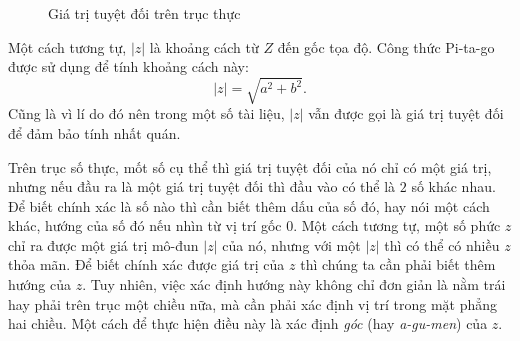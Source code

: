 \documentclass[a4paper, titlepage, openany]{book}
\begin{document}
\begin{figure}[h]
   \centering
   \caption{Giá trị tuyệt đối trên trục thực}
   \label{fig:gia_tri_tuyet_doi_thuc}
\end{figure}

Một cách tương tự, $|z|$ là khoảng cách từ $Z$ đến gốc tọa độ. Công thức Pi-ta-go được sử dụng để tính khoảng cách này: $$|z| = \sqrt{a^2+b^2}.$$ Cũng là vì lí do đó nên trong một số tài liệu, $|z|$ vẫn được gọi là giá trị tuyệt đối để đảm bảo tính nhất quán.

Trên trục số thực, mốt số cụ thể thì giá trị tuyệt đối của nó chỉ có một giá trị, nhưng nếu đầu ra là một giá trị tuyệt đối thì đầu vào có thể là $2$ số khác nhau. Để biết chính xác là số nào thì cần biết thêm dấu của số đó, hay nói một cách khác, hướng của số đó nếu nhìn từ vị trí gốc $0$. Một cách tương tự, một số phức $z$ chỉ ra được một giá trị mô-đun $|z|$ của nó, nhưng với một $|z|$ thì có thể có nhiều $z$ thỏa mãn. Để biết chính xác được giá trị của $z$ thì chúng ta cần phải biết thêm hướng của $z$. Tuy nhiên, việc xác định hướng này không chỉ đơn giản là nằm trái hay phải trên trục một chiều nữa, mà cần phải xác định vị trí trong mặt phẳng hai chiều. Một cách để thực hiện điều này là xác định \emph{góc} (hay \emph{a-gu-men}) của $z$.
\end{document}
